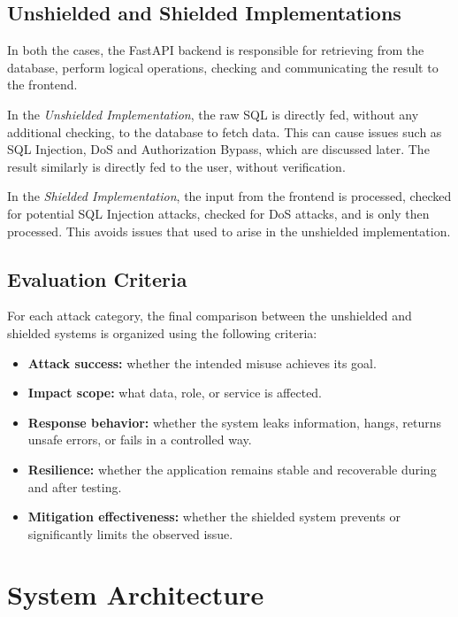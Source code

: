 \documentclass[11pt,a4paper]{article}
\begin{document}
\subsection{Unshielded and Shielded Implementations}

In both the cases, the FastAPI backend is responsible for retrieving from the database, perform logical operations, checking and communicating the result to the frontend.

In the \textit{Unshielded Implementation}, the raw SQL is directly fed, without any additional checking, to the database to fetch data. This can cause issues such as SQL Injection, DoS and Authorization Bypass, which are discussed later. The result similarly is directly fed to the user, without verification.

In the \textit{Shielded Implementation}, the input from the frontend is processed, checked for potential SQL Injection attacks, checked for DoS attacks, and is only then processed. This avoids issues that used to arise in the unshielded implementation.

\subsection{Evaluation Criteria}

For each attack category, the final comparison between the unshielded and shielded systems is organized using the following criteria:

\begin{itemize}
    \item \textbf{Attack success:} whether the intended misuse achieves its goal.
    \item \textbf{Impact scope:} what data, role, or service is affected.
    \item \textbf{Response behavior:} whether the system leaks information, hangs, returns unsafe errors, or fails in a controlled way.
    \item \textbf{Resilience:} whether the application remains stable and recoverable during and after testing.
    \item \textbf{Mitigation effectiveness:} whether the shielded system prevents or significantly limits the observed issue.
\end{itemize}

\section{System Architecture}
\end{document}
